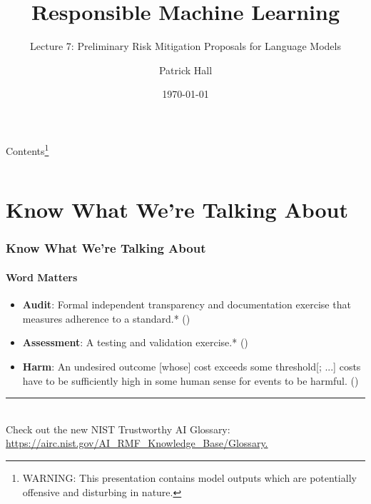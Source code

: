 \documentclass[11pt,
               aspectratio=169,
               hyperref={colorlinks}
               ]{beamer}
\author{Patrick Hall}
\title{Responsible Machine Learning}
\subtitle{Lecture 7: Preliminary Risk Mitigation Proposals for Language Models}
\institute{The George Washington University}
\date{\today}
\begin{document}
	
	\maketitle
	
	\begin{frame}{Contents\footnote{\tiny{WARNING: This presentation contains model outputs which are potentially offensive and disturbing in nature.}}}

	\begin{columns}[onlytextwidth]
		\tableofcontents[sections = 1-8]
		\tableofcontents[sections = 9-17]
	\end{columns}

	\end{frame}


	\section{Know What We're Talking About}

		\begin{frame}
	
			\frametitle{Know What We're Talking About}
			\framesubtitle{Word Matters}
			
			\begin{itemize}
				\item \textbf{Audit}: Formal independent transparency and documentation exercise that measures adherence to a standard.* (\cite{hasan2022algorithmic})
				
				\item \textbf{Assessment}: A testing and validation exercise.* (\cite{hasan2022algorithmic})
				
				\item \textbf{Harm}: An undesired outcome [whose] cost exceeds some threshold[; ...] costs have to be sufficiently high in some human sense for events to be harmful. (\cite{atherton2023language})		
			\end{itemize}
					
			\vspace{10pt}
			\par\noindent\rule{100pt}{0.4pt}\\
			\vspace{5pt}
			\scriptsize{Check out the new NIST Trustworthy AI Glossary: \url{https://airc.nist.gov/AI_RMF_Knowledge_Base/Glossary.}}

		\end{frame}
\end{document}
